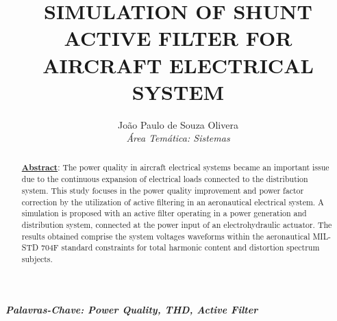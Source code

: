 \documentclass[]{seti2}
\title{\uppercase{Simulation of Shunt Active Filter for Aircraft Electrical System}}
\author{
					João Paulo de Souza Olivera\\
					{\normalsize\itshape Área Temática: Sistemas}\\
				}
\begin{document}
\maketitle

\begin{abstract}
		\underline{\textbf{Abstract}}: The power quality in aircraft electrical systems became an important issue due to the continuous expansion of electrical loads connected to the distribution system. This study focuses in the power quality improvement and power factor correction by the utilization of active filtering in an aeronautical electrical system. A simulation is proposed with an active filter operating in a power generation and distribution system, connected at the power input of an electrohydraulic actuator. The results obtained comprise the system voltages waveforms within the aeronautical MIL-STD 704F standard constraints for total harmonic content and distortion spectrum subjects.
\end{abstract}

\textbf{\textit{Palavras-Chave: Power Quality, THD, Active Filter}}








\newpage

\end{document}
